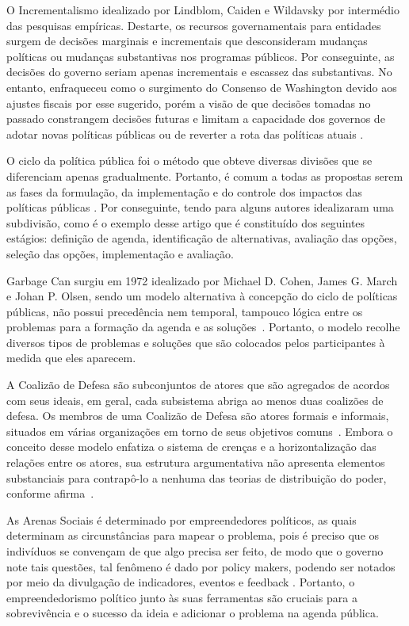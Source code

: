 O Incrementalismo idealizado por Lindblom, Caiden e Wildavsky por intermédio das pesquisas empíricas. 
Destarte, os recursos governamentais para entidades surgem de decisões marginais e incrementais que desconsideram mudanças políticas ou mudanças substantivas nos programas públicos. 
Por conseguinte, as decisões do governo seriam apenas incrementais e escassez das substantivas.
No entanto, enfraqueceu como o surgimento  do Consenso de Washington devido aos ajustes fiscais por esse sugerido, porém a visão de que decisões tomadas no passado constrangem decisões futuras e limitam a capacidade dos governos de adotar novas políticas públicas ou de reverter a rota das políticas atuais \cite{souza2006politicas}.

O ciclo da política pública foi o método que obteve diversas divisões que se diferenciam apenas gradualmente. 
Portanto, é comum a todas as propostas serem as fases da formulação, da implementação e do controle dos impactos das políticas públicas \cite{rua2013}.
Por conseguinte, tendo para alguns autores idealizaram uma subdivisão, como é o exemplo desse artigo que é constituído dos seguintes estágios: definição de agenda, identificação de alternativas, avaliação das opções, seleção das opções, implementação e avaliação.

Garbage Can surgiu em 1972 idealizado por Michael D. Cohen, James G. March e Johan P. Olsen, sendo um modelo alternativa à concepção do ciclo de políticas públicas, não possui precedência nem temporal, tampouco lógica entre os problemas para a formação da agenda  e as soluções~\cite{rua2013}.
Portanto, o modelo recolhe diversos tipos de problemas e soluções que são colocados pelos participantes à medida que eles aparecem.

A Coalizão de Defesa são subconjuntos de atores que são agregados de acordos com seus ideais, em geral, cada subsistema abriga ao menos duas coalizões de defesa.
Os membros de uma Coalizão de Defesa são atores formais e informais, situados em várias organizações em torno de seus objetivos comuns~\cite{rua2013}.
Embora o conceito desse modelo enfatiza o sistema de crenças e a horizontalização das relações entre os atores, sua estrutura argumentativa não apresenta elementos substanciais para contrapô-lo a nenhuma das teorias de distribuição do poder, conforme afirma~.

As Arenas Sociais é determinado por empreendedores políticos, as quais determinam as circunstâncias para mapear o problema, pois é preciso que os indivíduos se convençam de que algo precisa ser feito, de modo que o governo note tais questões, tal fenômeno é dado por policy makers, podendo ser notados por meio da divulgação de indicadores, eventos e  feedback \cite{souza2006politicas}.
Portanto, o empreendedorismo político junto às suas ferramentas são cruciais para a sobrevivência e o sucesso da ideia e adicionar o problema na agenda pública.

